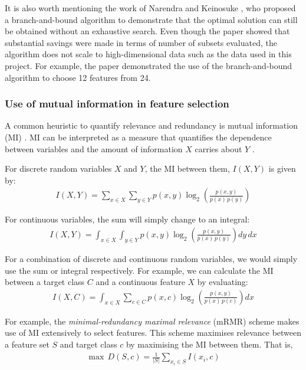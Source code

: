 \documentclass[12pt, twoside, a4paper]{article}
\begin{document}
It is also worth mentioning the work of Narendra and Keinosuke \cite{RefWorks:176}, who proposed a branch-and-bound algorithm to demonstrate that the optimal solution can still be obtained without an exhaustive search. Even though the paper showed that substantial savings were made in terms of number of subsets evaluated, the algorithm does not scale to high-dimensional data \cite{RefWorks:178} such as the data used in this project. For example, the paper demonstrated the use of the branch-and-bound algorithm to choose 12 features from 24.

\subsubsection{Use of mutual information in feature selection}

A common heuristic to quantify relevance and redundancy is mutual information (MI) \cite{RefWorks:98}. MI can be interpreted as a measure that quantifies the dependence between variables \cite{RefWorks:180} and the amount of information $X$ carries about $Y$ \cite{RefWorks:181}. 

For discrete random variables $X$ and $Y$, the MI between them, $I(X, Y)$ is given by:
\begin{align} \label{bg:fs:mi:dis}
I(X, Y) = \sum_{x \in X} \sum_{y \in Y} p(x, y) \log_2 \left(\frac{p(x, y)}{p(x) \, p(y)} \right) 
\end{align}

For continuous variables, the sum will simply change to an integral:
\begin{align} \label{bg:fs:mi:cont}
I(X, Y) = \int_{x \in X} \int_{y \in Y} p(x, y) \log_2 \left( \frac{p(x, y)}{p(x) \, p(y)} \right) dy \, dx
\end{align}

For a combination of discrete and continuous random variables, we would simply use the sum or integral respectively. For example, we can calculate the MI between a target class $C$ and a continuous feature $X$ by evaluating:
\begin{align} \label{bg:fs:mi:contDis}
I(X, C) = \int_{x \in X} \sum_{c \in C} p(x, c) \log_2 \left( \frac{p(x, y)}{p(x) \, p(c)} \right) dx
\end{align}

For example, the \textit{minimal-redundancy maximal relevance} (mRMR) scheme \cite{RefWorks:182} makes use of MI extensively to select features. This scheme maximises relevance between a feature set $S$ and target class $c$ by maximising the MI between them. That is,
\begin{align*}
\max \, D(S, c) = \frac{1}{|S|} \sum_{x_i \in S} I(x_i, c)
\end{align*}
\end{document}
